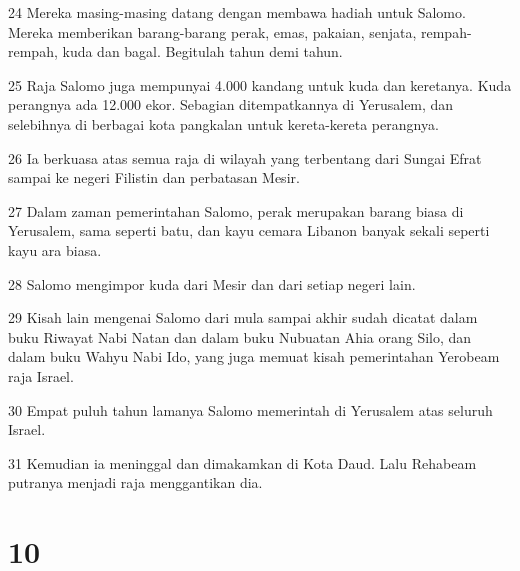 \par 24 Mereka masing-masing datang dengan membawa hadiah untuk Salomo. Mereka memberikan barang-barang perak, emas, pakaian, senjata, rempah-rempah, kuda dan bagal. Begitulah tahun demi tahun.
\par 25 Raja Salomo juga mempunyai 4.000 kandang untuk kuda dan keretanya. Kuda perangnya ada 12.000 ekor. Sebagian ditempatkannya di Yerusalem, dan selebihnya di berbagai kota pangkalan untuk kereta-kereta perangnya.
\par 26 Ia berkuasa atas semua raja di wilayah yang terbentang dari Sungai Efrat sampai ke negeri Filistin dan perbatasan Mesir.
\par 27 Dalam zaman pemerintahan Salomo, perak merupakan barang biasa di Yerusalem, sama seperti batu, dan kayu cemara Libanon banyak sekali seperti kayu ara biasa.
\par 28 Salomo mengimpor kuda dari Mesir dan dari setiap negeri lain.
\par 29 Kisah lain mengenai Salomo dari mula sampai akhir sudah dicatat dalam buku Riwayat Nabi Natan dan dalam buku Nubuatan Ahia orang Silo, dan dalam buku Wahyu Nabi Ido, yang juga memuat kisah pemerintahan Yerobeam raja Israel.
\par 30 Empat puluh tahun lamanya Salomo memerintah di Yerusalem atas seluruh Israel.
\par 31 Kemudian ia meninggal dan dimakamkan di Kota Daud. Lalu Rehabeam putranya menjadi raja menggantikan dia.

\chapter{10}

